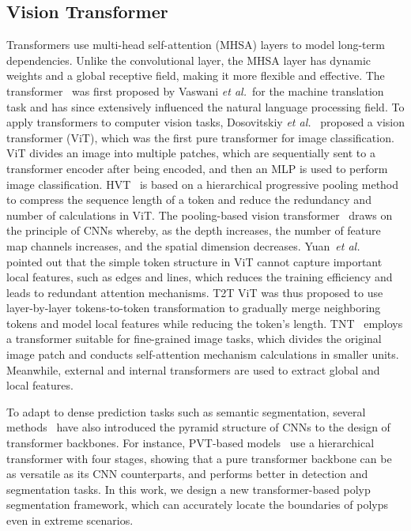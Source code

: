 \documentclass[journal]{IEEEtran}
\def\etal{\textit{et al.}}
\begin{document}
\subsection{Vision Transformer}\label{subsec:Transformer}
Transformers use multi-head self-attention (MHSA) layers to model long-term dependencies. 
Unlike the convolutional layer, the MHSA layer has dynamic weights and a global receptive field, making it more flexible and effective.
The transformer~\cite{vaswani2017attention} was first proposed by Vaswani \etal~for the machine translation task and has since extensively influenced the natural language processing field.
To apply transformers to computer vision tasks, Dosovitskiy \etal~\cite{dosovitskiy2020image} proposed a vision transformer (ViT), which was the first pure transformer for image classification.
ViT divides an image into multiple patches, which are sequentially sent to a transformer encoder after being encoded, and then an MLP is used to perform image classification. 
HVT~\cite{pan2021scalable} is based on a hierarchical progressive pooling method to compress the sequence length of a token and reduce the redundancy and number of calculations in ViT. 
The pooling-based vision transformer~\cite{heo2021rethinking} draws on the principle of CNNs whereby, as the depth increases, the number of feature map channels increases, and the spatial dimension decreases.
Yuan~\etal~\cite{yuan2021tokens} pointed out that the simple token structure in ViT cannot capture important local features, such as edges and lines, which reduces the training efficiency and leads to redundant attention mechanisms.
T2T ViT was thus proposed to use layer-by-layer tokens-to-token transformation to gradually merge neighboring tokens and model local features while reducing the token's length. 
TNT~\cite{han2021transformer} employs a transformer suitable for fine-grained image tasks, which divides the original image patch and conducts self-attention mechanism calculations in smaller units. 
Meanwhile, external and internal transformers are used to extract global and local features. 

To adapt to dense prediction tasks such as semantic segmentation, 
several methods~\cite{wang2021pyramid,wang2021pvtv2,liu2021swin,cvt,coat,twins,levit} have also introduced the pyramid structure of CNNs to the design of transformer backbones.
For instance, PVT-based models~\cite{wang2021pyramid,wang2021pvtv2} use a hierarchical transformer with four stages, showing that a pure transformer backbone can be as versatile as its CNN counterparts, and performs better in detection and segmentation tasks.
In this work, {we design a new transformer-based polyp segmentation framework}, which can accurately locate the boundaries of polyps even in extreme scenarios.
\end{document}
